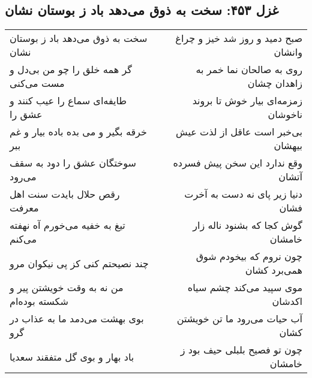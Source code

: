 \begin{center}
\section*{غزل ۴۵۳: سخت به ذوق می‌دهد باد ز بوستان نشان}
\label{sec:453}
\begin{longtable}{l p{0.5cm} r}
سخت به ذوق می‌دهد باد ز بوستان نشان
&&
صبح دمید و روز شد خیز و چراغ وانشان
\\
گر همه خلق را چو من بی‌دل و مست می‌کنی
&&
روی به صالحان نما خمر به زاهدان چشان
\\
طایفه‌ای سماع را عیب کنند و عشق را
&&
زمزمه‌ای بیار خوش تا بروند ناخوشان
\\
خرقه بگیر و می بده باده بیار و غم ببر
&&
بی‌خبر است عاقل از لذت عیش بیهشان
\\
سوختگان عشق را دود به سقف می‌رود
&&
وقع ندارد این سخن پیش فسرده آتشان
\\
رقص حلال بایدت سنت اهل معرفت
&&
دنیا زیر پای نه دست به آخرت فشان
\\
تیغ به خفیه می‌خورم آه نهفته می‌کنم
&&
گوش کجا که بشنود ناله زار خامشان
\\
چند نصیحتم کنی کز پی نیکوان مرو
&&
چون نروم که بیخودم شوق همی‌برد کشان
\\
من نه به وقت خویشتن پیر و شکسته بوده‌ام
&&
موی سپید می‌کند چشم سیاه اکدشان
\\
بوی بهشت می‌دمد ما به عذاب در گرو
&&
آب حیات می‌رود ما تن خویشتن کشان
\\
باد بهار و بوی گل متفقند سعدیا
&&
چون تو فصیح بلبلی حیف بود ز خامشان
\\
\end{longtable}
\end{center}

